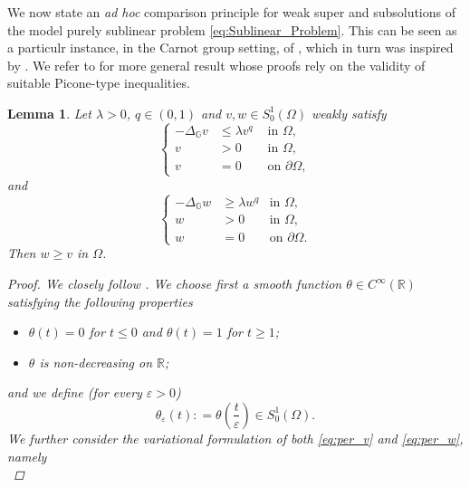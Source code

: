 \documentclass[11pt]{amsart}
\numberwithin{equation}{section} %
\newtheorem{lemma}[teo]{Lemma}
\theoremstyle{definition}
\def\G{\mathbb{G}}
\begin{document}
We now state an {\em ad hoc} comparison principle for weak super and subsolutions of the model purely sublinear problem \eqref{eq:Sublinear_Problem}. This can be seen as a particulr instance, in the Carnot group setting, of \cite[Lemma 3.3]{ABC}, which in turn was inspired by \cite{BrezisKamin}. We refer to \cite{Ruzhansky_Suragan} for more general result whose proofs rely on the validity of suitable Picone-type inequalities.

	\begin{lemma}\label{lem:Weak_Comparison_Model}
		Let $\lambda >0$, $q\in (0,1)$ and $v,w\in S^1_0(\Omega)$ weakly satisfy
		\begin{equation}\label{eq:per_v}
		   \left\{\begin{array}{rll}
		   	-\Delta_\G v &\leq \lambda  v^q & \textrm{ in }\Omega,\\
		    v& >0 & \textrm{ in } \Omega,\\
		    v&=0 & \textrm{ on } \partial \Omega,
		   \end{array}
		   \right.
		\end{equation}
		\noindent and 
			\begin{equation}\label{eq:per_w}
			\left\{\begin{array}{rll}
				-\Delta_\G w& \geq \lambda w^q & \textrm{in }\Omega,\\
				w &>0 & \textrm{in }\Omega,\\
				w&=0 & \textrm{on } \partial \Omega.
			\end{array}
			\right.
		\end{equation}
		 Then $w\geq v$ in $\Omega$.
		\begin{proof}
			We closely follow \cite[Proof of Lemma 3.3]{ABC}. 
			We choose first a smooth function $\theta\in C^\infty(\mathbb{R})$ satisfying the following properties
			\begin{itemize}
				\item  $\theta(t) = 0$ for $t \leq 0$ and $\theta(t) =1$ for $t \geq 1$;
				\item $\theta$ is non-decreasing on $\mathbb{R}$;
			\end{itemize}
			and we define (for every $\varepsilon > 0$)
			$$\theta_\varepsilon(t): = \theta\left(\frac{t}{\varepsilon}\right) \in S_0^1(\Omega).$$ 
			We further consider the variational formulation of both \eqref{eq:per_v} and \eqref{eq:per_w}, namely 
			\begin{equation}\label{eq:variational_for_w}

\end{equation}
\end{proof}
\end{lemma}
\end{document}
